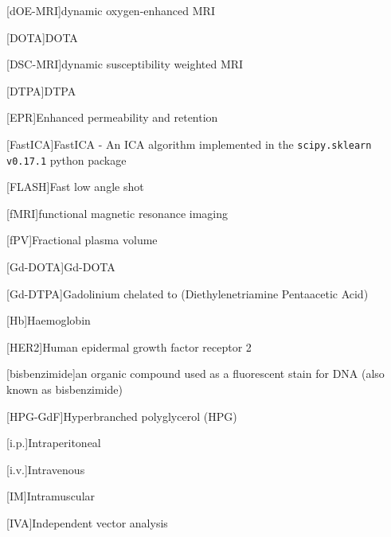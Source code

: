 \begin{acronym}
[dOE-MRI]{dynamic oxygen-enhanced MRI}%

[DOTA]{DOTA}

[DSC-MRI]{dynamic susceptibility weighted MRI}

[DTPA]{DTPA}

[EPR]{Enhanced permeability and retention}%

[FastICA]{FastICA -  An ICA algorithm implemented in the \texttt{scipy.sklearn v0.17.1} python package}

[FLASH]{Fast low angle shot}

[fMRI]{functional magnetic resonance imaging}

[fPV]{Fractional plasma volume}

[Gd-DOTA]{Gd-DOTA}

[Gd-DTPA]{Gadolinium chelated to (Diethylenetriamine Pentaacetic Acid)}%

[Hb]{Haemoglobin}

[HER2]{Human epidermal growth factor receptor 2}

[bisbenzimide]{an organic compound used as a fluorescent stain for DNA (also known as bisbenzimide)}

[HPG-GdF]{Hyperbranched polyglycerol (HPG)}%

[i.p.]{Intraperitoneal}%

[i.v.]{Intravenous}%

[IM]{Intramuscular}

[IVA]{Independent vector analysis}


\end{acronym}
